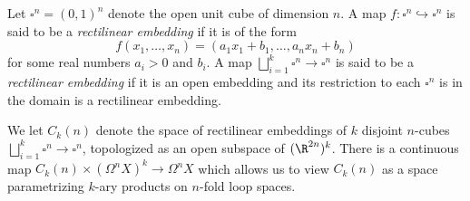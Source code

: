 \documentclass[11pt,letterpaper]{article}
\begin{document}
\begin{problem}
    Let $\square^n = (0,1)^n$ denote the open unit cube of dimension $n$. A map $f : \square^n \hookrightarrow \square^n$ is said to be a \emph{rectilinear embedding} if it is of the form
    \[
        f(x_1,\ldots,x_n) = (a_1x_1 + b_1, \ldots, a_n x_n + b_n)
    \]
    for some real numbers $a_i > 0$ and $b_i$. A map $\bigsqcup^k_{i=1} \square^n \to \square^n$ is said to be a \emph{rectilinear embedding} if it is an open embedding and its restriction to each $\square^n$ is in the domain is a rectilinear embedding.
    
    \medskip
    \quad We let $C_k(n)$ denote the space of rectilinear embeddings of $k$ disjoint $n$-cubes $\bigsqcup_{i=1}^k \square^n \to \square^n$, topologized as an open subspace of $(\R^{2n})^k$. There is a continuous map $C_k(n)\times (\Omega^n X)^k \to \Omega^n X$ which allows us to view $C_k(n)$ as a space parametrizing $k$-ary products on $n$-fold loop spaces.
\end{problem}
\end{document}

